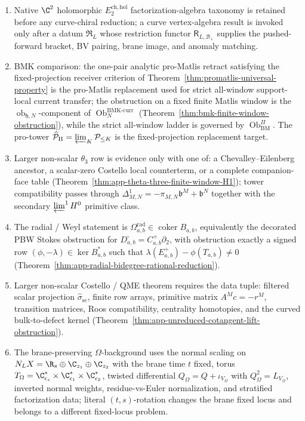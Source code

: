 \documentclass[11pt]{memoir}
\begin{document}
\begin{enumerate}
\item Native \(\C^2\) holomorphic \(E_2^{\mathrm{ch,hol}}\) factorization-algebra
  taxonomy is retained before any curve-chiral reduction; a curve
  vertex-algebra result is invoked only after a datum
  \(\mathfrak R_L\) whose restriction functor
  \(\mathsf R_{L,\mathcal B_\perp}\) supplies the pushed-forward
  bracket, BV pairing, brane image, and anomaly matching.
\item BMK comparison: the one-pair analytic pro-Matlis retract satisfying
  the fixed-projection receiver criterion of
  Theorem~\ref{thm:promatlis-universal-property} is the pro-Matlis
  replacement used for strict all-window support-local current transfer;
  the obstruction on a fixed finite Matlis window is the
  \(\operatorname{ob}_{\mathfrak h,N}\)-component of
  \(\operatorname{Ob}^{\mathrm{BMK\mbox{-}curr}}_N\)
  (Theorem~\ref{thm:bmk-finite-window-obstruction}), while the strict
  all-window ladder is governed by
  \(\operatorname{Ob}^\Pi_{\mathrm{BM}}\).  The pro-tower
  \(\widehat{\mathcal P}_\Pi=\varprojlim_K\mathcal P_{\le K}\) is the
  fixed-projection replacement target.
\item Larger non-scalar \(\theta_3\) row is evidence only with
  one of: a Chevalley--Eilenberg ancestor, a scalar-zero Costello
  local counterterm, or a complete companion-face table
  (Theorem~\ref{thm:app-theta-three-finite-window-H1}); tower
  compatibility passes through
  \(\Delta^1_{M,N}=-\pi_{M,N}\mathfrak b^M+\mathfrak b^N\) together
  with the secondary \(\varprojlim^1 H^0\) primitive class.
\item The radial / Weyl statement is
  \(\Omega^{\mathrm{rad}}_{a,b}\in\operatorname{coker}B_{a,b}\),
  equivalently the decorated PBW Stokes obstruction for
  \(D^\square_{a,b}=C^+_{a,b}\partial_2\), with obstruction exactly a
  signed row \((\phi,-\lambda)\in\ker B^*_{a,b}\) such that
  \(\lambda(E^+_{a,b})-\phi(T_{a,b})\ne 0\)
  (Theorem~\ref{thm:app-radial-bidegree-rational-reduction}).
\item Larger non-scalar Costello / QME theorem requires the data
  tuple: filtered scalar projection \(\widehat\sigma_{\mathrm{sc}}\),
  finite row arrays, primitive matrix \(A^M c=-r^M\), transition
  matrices, Roos compatibility, centrality homotopies, and the
  curved bulk-to-defect kernel
  (Theorem~\ref{thm:app-unreduced-cotangent-lift-obstruction}).
\item The brane-preserving \(\Omega\)-background uses the normal
  scaling on \(N_L X=\R_s\oplus\C_{z_1}\oplus\C_{z_2}\) with the
  brane time \(t\) fixed, torus
  \(T_\Omega=\C^*_{\epsilon_s}\times\C^*_{\epsilon_1}\times\C^*_{\epsilon_2}\),
  twisted differential
  \(Q_\Omega=Q+\iota_{V_\Omega}\) with \(Q_\Omega^2=L_{V_\Omega}\),
  inverted normal weights, residue-vs-Euler normalization, and
  stratified factorization data; literal \((t,s)\)-rotation changes
  the brane fixed locus and belongs to a different fixed-locus
  problem.
\end{enumerate}
\end{document}
